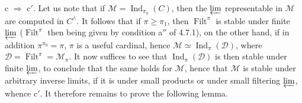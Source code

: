 \documentclass[11pt]{article}
\newcommand{\Ind}{\operatorname{Ind}}
\newcommand{\Filt}{\operatorname{Filt}}
\begin{document}
c $\Longrightarrow$ c$'$. Let us note that if $\mathcal{M}=\Ind_{\pi_0}(C)$, then the $\varprojlim$ representable in $\mathcal{M}$ are computed in $C^\wedge$. It follows that if $\pi\geqslant\pi_1$, then $\Filt^\pi$ is stable under finite $\varprojlim$ ($\Filt^\pi$ then being given by condition a$''$ of 4.7.1), on the other hand, if in addition $\pi^{\pi_0}=\pi$, $\pi$ is a useful cardinal, hence $\mathcal{M}\simeq\Ind_\pi(\mathcal{D})$, where $\mathcal{D}=\Filt^\pi=\mathcal{M}_\pi$. It now suffices to see that $\Ind_\pi(\mathcal{D})$ is then stable under finite $\varprojlim$, to conclude that the same holds for $\mathcal{M}$, hence that $\mathcal{M}$ is stable under arbitrary inverse limits, if it is under small products or under small filtering $\varprojlim$, whence c$'$. It therefore remains to prove the following lemma. %
\end{document}
